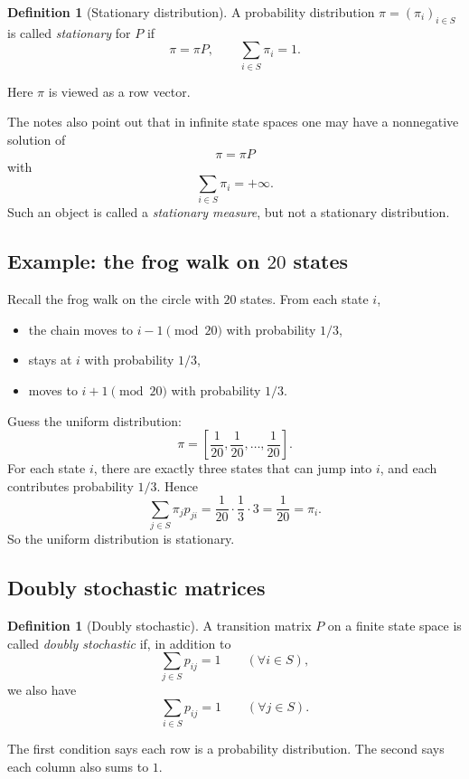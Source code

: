 \documentclass[11pt]{article}
\theoremstyle{definition}
\newtheorem{definition}[theorem]{Definition}
\begin{document}
\begin{definition}[Stationary distribution]
A probability distribution \(\pi=(\pi_i)_{i\in S}\) is called \emph{stationary} for \(P\) if
\[
\pi=\pi P,
\qquad
\sum_{i\in S}\pi_i=1.
\]
\end{definition}

Here \(\pi\) is viewed as a row vector.

The notes also point out that in infinite state spaces one may have a nonnegative solution of
\[
\pi=\pi P
\]
with
\[
\sum_{i\in S}\pi_i=+\infty.
\]
Such an object is called a \emph{stationary measure}, but not a stationary distribution.

\subsection{Example: the frog walk on \texorpdfstring{$20$}{20} states}

Recall the frog walk on the circle with \(20\) states. From each state \(i\),
\begin{itemize}[leftmargin=2em]
    \item the chain moves to \(i-1 \pmod{20}\) with probability \(1/3\),
    \item stays at \(i\) with probability \(1/3\),
    \item moves to \(i+1 \pmod{20}\) with probability \(1/3\).
\end{itemize}

Guess the uniform distribution:
\[
\pi=
\left[\frac1{20},\frac1{20},\dots,\frac1{20}\right].
\]
For each state \(i\), there are exactly three states that can jump into \(i\), and each contributes probability \(1/3\). Hence
\[
\sum_{j\in S} \pi_j p_{ji}
=
\frac1{20}\cdot \frac13 \cdot 3
=
\frac1{20}
=
\pi_i.
\]
So the uniform distribution is stationary.

\subsection{Doubly stochastic matrices}

\begin{definition}[Doubly stochastic]
A transition matrix \(P\) on a finite state space is called \emph{doubly stochastic} if, in addition to
\[
\sum_{j\in S} p_{ij}=1
\qquad (\forall i\in S),
\]
we also have
\[
\sum_{i\in S} p_{ij}=1
\qquad (\forall j\in S).
\]
\end{definition}

The first condition says each row is a probability distribution. The second says each column also sums to \(1\).
\end{document}
